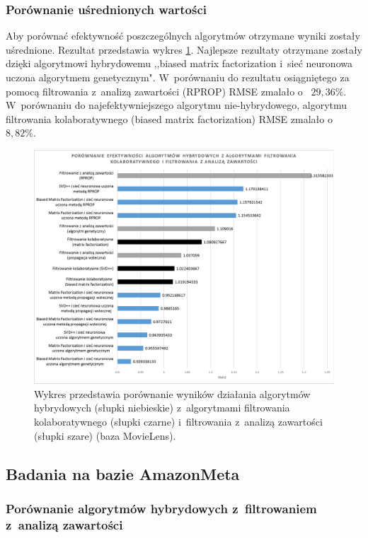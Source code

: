 \documentclass[twoside]{iisthesis}
\begin{document}
		\subsubsection{Porównanie uśrednionych wartości}
		
		Aby porównać efektywność poszczególnych algorytmów otrzymane wyniki zostały uśrednione. Rezultat przedstawia wykres \ref{fig:ml_exphybrid}. Najlepsze rezultaty otrzymane zostały dzięki algorytmowi hybrydowemu ,,biased matrix factorization i~sieć neuronowa uczona algorytmem genetycznym". W~porównaniu do rezultatu osiągniętego za pomocą filtrowania z~analizą zawartości (RPROP) RMSE zmalało o~ $29,36\%$. W~porównaniu do najefektywniejszego algorytmu nie-hybrydowego, algorytmu filtrowania kolaboratywnego (biased matrix factorization) RMSE zmalało o~$8,82\%$.
		
		\begin{figure}
			\centering
			\includegraphics[width=1\textwidth]{ml_exphybrid}	
			\caption{Wykres przedstawia porównanie wyników działania algorytmów hybrydowych (słupki niebieskie) z~algorytmami filtrowania kolaboratywnego (słupki czarne) i~filtrowania z~analizą zawartości (słupki szare) (baza MovieLens).}
			\label{fig:ml_exphybrid}
		\end{figure}
		
		\subsection{Badania na bazie AmazonMeta}
				
		\subsubsection{Porównanie algorytmów hybrydowych z~filtrowaniem z~analizą zawartości}
		
\end{document}
